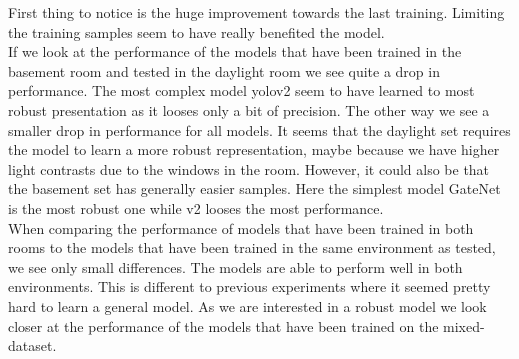 \documentclass{article}
\begin{document}
First thing to notice is the huge improvement towards the last training. Limiting the training samples seem to have really benefited the model.
\\

If we look at the performance of the models that have been trained in the basement room and tested in the daylight room we see quite a drop in performance. The most complex model yolov2 seem to have learned to most robust presentation as it looses only a bit of precision. The other way we see a smaller drop in performance for all models. It seems that the daylight set requires the model to learn a more robust representation, maybe because we have higher light contrasts due to the windows in the room. However, it could also be that the basement set has generally easier samples. Here the simplest model GateNet is the most robust one while v2 looses the most performance.
\\

When comparing the performance of models that have been trained in both rooms to the models that have been trained in the same environment as tested, we see only small differences. The models are able to perform well in both environments. This is different to previous experiments where it seemed pretty hard to learn a general model. As we are interested in a robust model we look closer at the performance of the models that have been trained on the mixed-dataset.
\end{document}
